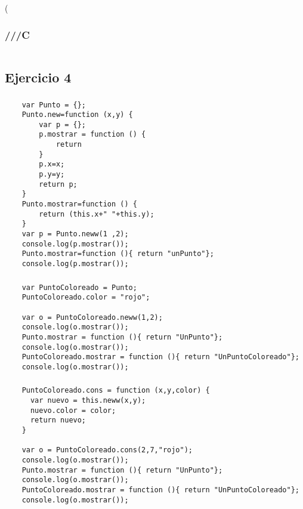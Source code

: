 \left( \documentclass[10pt,a4paper]{article}
\begin{document}
\subsubsection{///C}
    \begin{lstlisting}
    \end{lstlisting}
\subsection{Ejercicio 4}
\subsubsection{}
    \begin{lstlisting}
    var Punto = {};
    Punto.new=function (x,y) {
    	var p = {};
    	p.mostrar = function () {
	    	return 
    	}
    	p.x=x;
    	p.y=y;
    	return p;
    }
    Punto.mostrar=function () {
    	return (this.x+" "+this.y);
    }
    var p = Punto.neww(1 ,2);
    console.log(p.mostrar());
    Punto.mostrar=function (){ return "unPunto"};
    console.log(p.mostrar());
    \end{lstlisting}

\subsubsection{}
    \begin{lstlisting}
    var PuntoColoreado = Punto;
    PuntoColoreado.color = "rojo";
    
    var o = PuntoColoreado.neww(1,2);
    console.log(o.mostrar());
    Punto.mostrar = function (){ return "UnPunto"};
    console.log(o.mostrar());
    PuntoColoreado.mostrar = function (){ return "UnPuntoColoreado"};
    console.log(o.mostrar());
    \end{lstlisting}
\subsubsection{}
    \begin{lstlisting}
    PuntoColoreado.cons = function (x,y,color) {
      var nuevo = this.neww(x,y);
      nuevo.color = color;
      return nuevo;
    }

    var o = PuntoColoreado.cons(2,7,"rojo");
    console.log(o.mostrar());
    Punto.mostrar = function (){ return "UnPunto"};
    console.log(o.mostrar());
    PuntoColoreado.mostrar = function (){ return "UnPuntoColoreado"};
    console.log(o.mostrar());
    \end{lstlisting}
\end{document}
